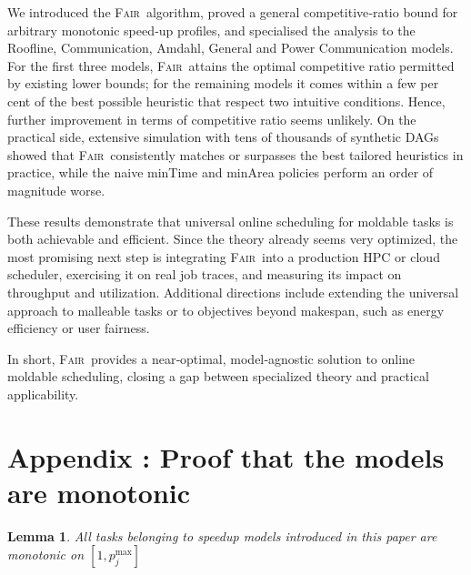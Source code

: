 \documentclass{article}
\newtheorem{lemma}{Lemma}
\newcommand\fair{\textsc{Fair}\xspace}
\begin{document}
We introduced the \fair\ algorithm, proved a general competitive‑ratio bound for arbitrary monotonic speed‑up profiles, and specialised the analysis to the Roofline, Communication, Amdahl, General and Power Communication models.  
For the first three models, \fair\ attains the optimal competitive ratio permitted by existing lower bounds; for the remaining models it comes within a few per cent of the best possible heuristic that respect two intuitive conditions. Hence, further improvement in terms of competitive ratio seems unlikely. 
On the practical side, extensive simulation with tens of thousands of synthetic DAGs showed that \fair\ consistently matches or surpasses the best tailored heuristics in practice, while the naive minTime and minArea policies perform an order of magnitude worse.  

These results demonstrate that universal online scheduling for moldable tasks is both achievable and efficient.  
Since the theory already seems very optimized, the most promising next step is integrating \fair\ into a production HPC or cloud scheduler, exercising it on real job traces, and measuring its impact on throughput and utilization.  
Additional directions include extending the universal approach to malleable tasks or to objectives beyond makespan, such as energy efficiency or user fairness.  

In short, \fair\ provides a near‑optimal, model‑agnostic solution to online moldable scheduling, closing a gap between specialized theory and practical applicability.





\appendix
\FloatBarrier 

\newpage

\section{Appendix : Proof that the models are monotonic}
\label{ap.detailedproof}

\begin{lemma}
All tasks belonging to speedup models introduced in this paper are monotonic on $[1, p_j^{\max}]$
\end{lemma}
\end{document}
